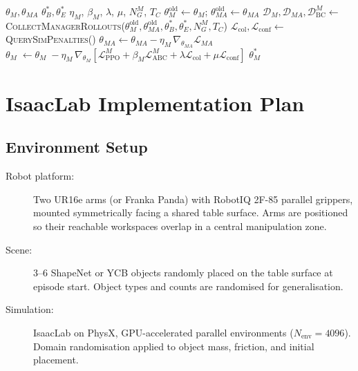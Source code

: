 \documentclass[12pt, a4paper]{article}
\newcommand{\calL}{\mathcal{L}}
\newcommand{\calD}{\mathcal{D}}
\begin{document}
\begin{algorithm}[H]
\caption{Phase 2 — Manager Training via Meta-ASP}
\label{alg:phase2}
\begin{algorithmic}[1]
\Require $\theta_M, \theta_{MA}$ 
\Require $\theta_B^*, \theta_E^*$ 
\Require $\eta_M$, $\beta_M$, $\lambda$, $\mu$, $N_G^M$, $T_C$
    \State $\theta_M^{\mathrm{old}} \leftarrow \theta_M$;\;
           $\theta_{MA}^{\mathrm{old}} \leftarrow \theta_{MA}$
        \State $\calD_M, \calD_{MA}, \calD_{\mathrm{BC}}^M \leftarrow$
               \textsc{CollectManagerRollouts}($\theta_M^{\mathrm{old}}, \theta_{MA}^{\mathrm{old}},
               \theta_B^*, \theta_E^*, N_G^M, T_C$)
        \State $\calL_{\mathrm{col}}, \calL_{\mathrm{conf}} \leftarrow$
               \textsc{QuerySimPenalties}() 
    \EndFor
    \State $\theta_{MA} \leftarrow \theta_{MA} - \eta_M\,\nabla_{\theta_{MA}}\calL_{MA}$
    \State $\theta_M \;\leftarrow \theta_M \;- \eta_M\,\nabla_{\theta_M}
           [\calL_{\mathrm{PPO}}^M + \beta_M\calL_{\mathrm{ABC}}^M
           + \lambda\calL_{\mathrm{col}} + \mu\calL_{\mathrm{conf}}]$
\EndFor
\State \Return $\theta_M^*$
\end{algorithmic}
\end{algorithm}

\section{IsaacLab Implementation Plan}
\label{sec:implementation}

\subsection{Environment Setup}
\label{subsec:env_setup}

\begin{description}
    \item[Robot platform:] Two UR16e arms (or Franka Panda) with RobotIQ 2F-85 parallel
          grippers, mounted symmetrically facing a shared table surface. Arms are
          positioned so their reachable workspaces overlap in a central manipulation zone.

    \item[Scene:] 3--6 ShapeNet or YCB objects randomly placed on the table surface at
          episode start. Object types and counts are randomised for generalisation.

    \item[Simulation:] IsaacLab on PhysX, GPU-accelerated parallel environments
          ($N_{\mathrm{env}} = 4096$). Domain randomisation applied to object mass,
          friction, and initial placement.
\end{description}
\end{document}
